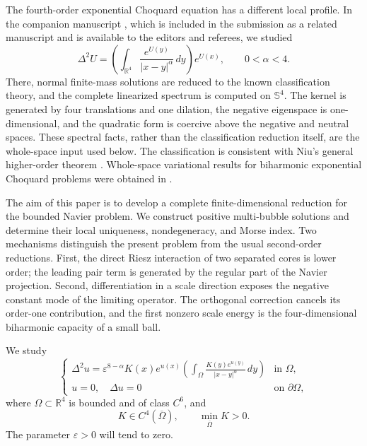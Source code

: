\documentclass[11pt]{article}
\numberwithin{equation}{section}
\begin{document}
The fourth-order exponential Choquard equation has a different local
profile. In the companion manuscript
\cite[Theorems 1.1 and 1.2]{DengSpectrum}, which is included in the
submission as a related manuscript and is available to the editors and
referees, we studied
\[
\Delta^2U
=\left(\int_{\mathbb R^4}
\frac{e^{U(y)}}{|x-y|^\alpha}\,dy\right)e^{U(x)},
\qquad 0<\alpha<4.
\]
There, normal finite-mass solutions are reduced to the known
classification theory, and the complete linearized spectrum is
computed on $\mathbb S^4$. The kernel is generated by four
translations and one dilation, the negative eigenspace is
one-dimensional, and the quadratic form is coercive above the
negative and neutral spaces. These spectral facts, rather than the
classification reduction itself, are the whole-space input used
below. The classification is consistent with Niu's general
higher-order theorem \cite{NiuClassification}. Whole-space
variational results for biharmonic exponential Choquard problems were
obtained in \cite{ChenLiWang}.

The aim of this paper is to develop a complete finite-dimensional
reduction for the bounded Navier problem. We construct positive
multi-bubble solutions and determine their local uniqueness,
nondegeneracy, and Morse index. Two mechanisms distinguish the present
problem from the usual second-order reductions. First, the direct
Riesz interaction of two separated cores is lower order; the leading
pair term is generated by the regular part of the Navier projection.
Second, differentiation in a scale direction exposes the negative
constant mode of the limiting operator. The orthogonal correction
cancels its order-one contribution, and the first nonzero scale
energy is the four-dimensional biharmonic capacity of a small ball.

We study
\begin{equation}\label{eq:perturbed-problem}
\begin{cases}
\displaystyle
\Delta^{2}u=\varepsilon^{8-\alpha}K(x)e^{u(x)}
\left(\int_{\Omega}\frac{K(y)e^{u(y)}}{|x-y|^{\alpha}}\,dy\right)
&\text{in }\Omega,\\[1.2ex]
u=0,\quad \Delta u=0
&\text{on }\partial\Omega,
\end{cases}
\end{equation}
where $\Omega\subset\mathbb R^4$ is bounded and of class $C^6$, and
\begin{equation*}
K\in C^4(\overline\Omega),
\qquad \min_{\overline\Omega}K>0.
\end{equation*}
The parameter $\varepsilon>0$ will tend to zero.
\end{document}
